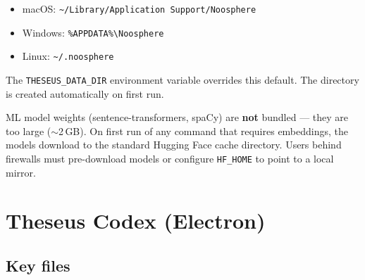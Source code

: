 \documentclass[11pt,letterpaper]{article}
\newcommand{\file}[1]{\texttt{#1}}
\newcommand{\cmd}[1]{\texttt{#1}}
\begin{document}
\begin{itemize}[leftmargin=1.5em,itemsep=0.1em]
  \item macOS: \file{\textasciitilde/Library/Application Support/Noosphere}
  \item Windows: \file{\%APPDATA\%\textbackslash Noosphere}
  \item Linux: \file{\textasciitilde/.noosphere}
\end{itemize}

The \cmd{THESEUS\_DATA\_DIR} environment variable overrides this default. The directory is created automatically on first run.

ML model weights (sentence-transformers, spaCy) are \textbf{not} bundled --- they are too large (${\sim}$2\,GB). On first run of any command that requires embeddings, the models download to the standard Hugging Face cache directory. Users behind firewalls must pre-download models or configure \cmd{HF\_HOME} to point to a local mirror.

\section{Theseus Codex (Electron)}

\subsection{Key files}
\end{document}
